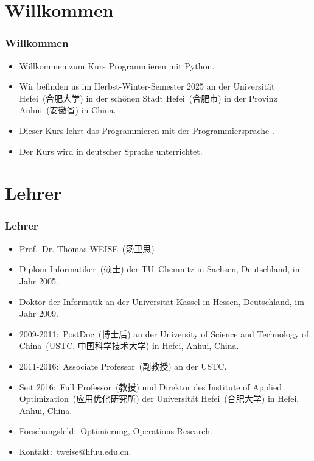 \documentclass[aspectratio=169,mathserif,notheorems]{beamer}%
\subtitle{1.~Organisation}%
\begin{document}
%
%
\startPresentation%
%
\section{Willkommen}%
%
\begin{frame}[t]%
\frametitle{Willkommen}%
\begin{itemize}%
%
\item Willkommen zum Kurs \alert{Programmieren mit Python}.%
%
\item<2-> Wir befinden us im Herbst-Winter-Semester 2025 an der Universität Hefei~(合肥大学) in der schönen Stadt Hefei~(合肥市) in der Provinz Anhui~(安徽省) in China.%
%
\item<3-> Dieser Kurs lehrt das Programmieren mit der Programmiersprache \python.%
%
\item<4-> Der Kurs wird in deutscher Sprache unterrichtet.%
%
\end{itemize}%
\end{frame}%
%
\section{Lehrer}%
%
\begin{frame}[t]%
\frametitle{Lehrer}%
\begin{itemize}%
%
\item Prof.~Dr. Thomas WEISE~(汤卫思)%
%
\item<2-> Diplom-Informatiker~(硕士) der TU~Chemnitz in Sachsen, Deutschland, im Jahr 2005.%
%
\item<3-> Doktor der Informatik an der Universität Kassel in Hessen, Deutschland, im Jahr 2009.
%
\item<4-> 2009-2011:~PostDoc~(博士后) an der University of Science and Technology of China~(USTC, 中国科学技术大学) in Hefei, Anhui, China.%
%
\item<5-> 2011-2016:~Associate Professor~(副教授) an der USTC.%
%
\item<6-> Seit 2016:~Full Professor~(教授) und Direktor des Institute of Applied Optimization~(应用优化研究所) der Universität Hefei~(合肥大学) in Hefei, Anhui, China.%
%
\item<7-> Forschungsfeld:~Optimierung, Operations Research.%
%
\item<8-> Kontakt:~\href{mailto:tweise@hfuu.edu.cn}{tweise@hfuu.edu.cn}.%
%
\end{itemize}%
\end{frame}%
%
\end{document}
